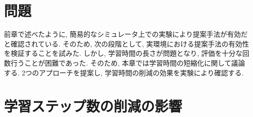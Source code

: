 
\section{問題}
前章で述べたように, 簡易的なシミュレータ上での実験により提案手法が有効だと確認されている. そのため, 次の段階として, 実環境における提案手法の有効性を検証することを試みた. しかし, 学習時間の長さが問題となり, 評価を十分な回数行うことが困難であった. そのため, 本章では学習時間の短縮化に関して議論する. 2つのアプローチを提案し, 学習時間の削減の効果を実験により確認する.



\newpage
\section{学習ステップ数の削減の影響}




